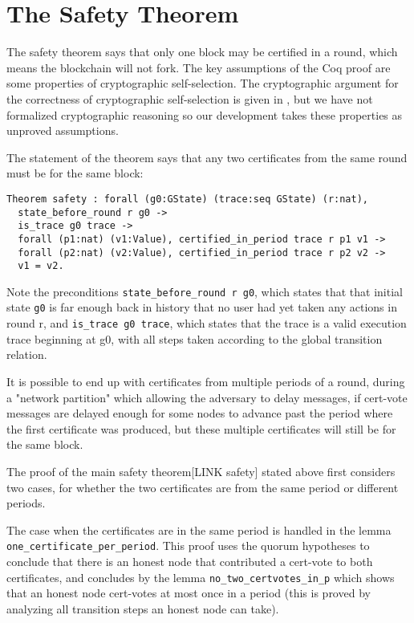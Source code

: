 \section{The Safety Theorem}
\label{sec:safety}

The safety theorem says that only one block may be certified in a round,
which means the blockchain will not fork.
The key assumptions of the Coq proof are some properties of cryptographic self-selection.
The cryptographic argument for the correctness of cryptographic self-selection
is given in \cite{}, but we have not formalized cryptographic reasoning so
our development takes these properties as unproved assumptions.

The statement of the theorem says that any two certificates from the same round
must be for the same block:

\begin{lstlisting}[language=Coq]
Theorem safety : forall (g0:GState) (trace:seq GState) (r:nat),
  state_before_round r g0 ->
  is_trace g0 trace ->
  forall (p1:nat) (v1:Value), certified_in_period trace r p1 v1 ->
  forall (p2:nat) (v2:Value), certified_in_period trace r p2 v2 ->
  v1 = v2.
\end{lstlisting}


Note the preconditions \lstinline{state_before_round r g0}, which states that
that initial state \lstinline{g0} is far enough back in history that no user
had yet taken any actions in round r, and \lstinline[breaklines=true]{is_trace g0 trace},
which states that the trace is a valid execution trace beginning at g0,
with all steps taken according to the global transition relation.

It is possible to end up with certificates from multiple periods of a round,
during a "network partition" which allowing the adversary to delay messages,
if cert-vote messages are delayed enough for some nodes to advance past the
period where the first certificate was produced, but these multiple certificates
will still be for the same block.

The proof of the main safety theorem[LINK safety] stated above first considers two
cases, for whether the two certificates are from the same period or different
periods.

The case when the certificates are in the same period is handled in the lemma
\lstinline{one_certificate_per_period}.
This proof uses the quorum hypotheses to conclude that there is an honest node
that contributed a cert-vote to both certificates,
and concludes by the lemma \lstinline{no_two_certvotes_in_p} which shows that an
honest node cert-votes at most once in a period (this is proved by analyzing
all transition steps an honest node can take).

